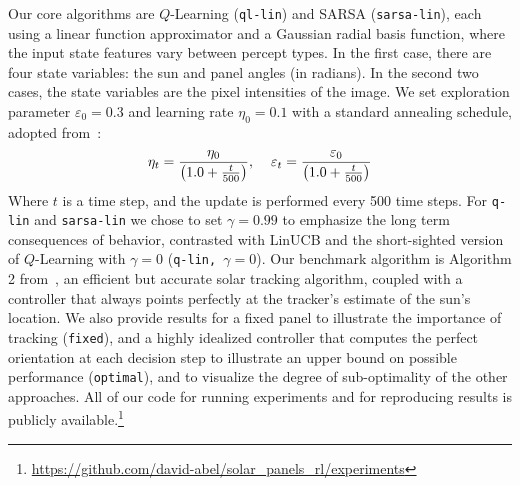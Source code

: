 \documentclass{article}
\begin{document}
Our core algorithms are $Q$-Learning (\texttt{ql-lin}) and SARSA (\texttt{sarsa-lin}), each using a linear function approximator and a Gaussian radial basis function, where the input state features vary between percept types. In the first case, there are four state variables: the sun and panel angles (in radians). In the second two cases, the state variables are the pixel intensities of the image. We set exploration parameter $\varepsilon_0=0.3$ and learning rate $\eta_0 = 0.1$ with a standard annealing schedule, adopted from~\citet{darken1990note}:
\begin{align*}
\eta_t = \frac{\eta_0}{\left(1.0 + \frac{t}{500}\right)}, \hspace{4mm} \varepsilon_t = \frac{\varepsilon_0}{\left(1.0 + \frac{t}{500}\right)}
\end{align*}
Where $t$ is a time step, and the update is performed every 500 time steps. For  \texttt{q-lin} and \texttt{sarsa-lin} we chose to set $\gamma=0.99$ to emphasize the long term consequences of behavior, contrasted with LinUCB and the short-sighted version of $Q$-Learning with $\gamma = 0$ (\texttt{q-lin, $\gamma = 0$}). Our benchmark algorithm is Algorithm 2 from~\citet{Grena2012}, an efficient but accurate solar tracking algorithm, coupled with a controller that always points perfectly at the tracker's estimate of the sun's location. We also provide results for a fixed panel to illustrate the importance of tracking (\texttt{fixed}), and a highly idealized controller that computes the perfect orientation at each decision step to illustrate an upper bound on possible performance (\texttt{optimal}), and to visualize the degree of sub-optimality of the other approaches. All of our code for running experiments and for reproducing results is publicly available.\footnote{\url{https://github.com/david-abel/solar_panels_rl/experiments}}
\end{document}
